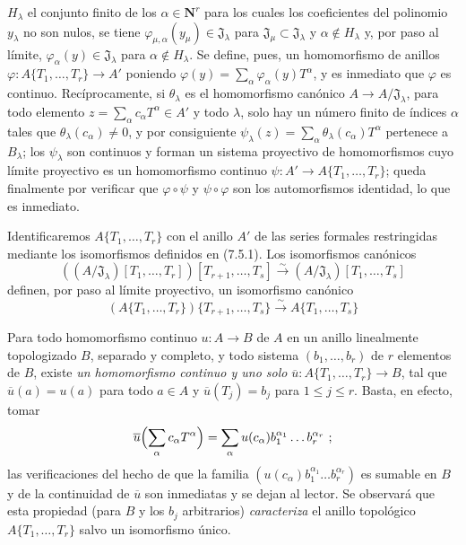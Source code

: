 \begin{env}[7.5.1]
$H_\lambda$ el conjunto finito de los $\alpha\in\mathbf{N}^r$ para los cuales los
coeficientes del polinomio $y_\lambda$ no son nulos, se tiene
$\varphi_{\mu,\alpha}(y_\mu)\in\mathfrak J_\lambda$ para
$\mathfrak J_\mu\subset\mathfrak J_\lambda$ y $\alpha\notin H_\lambda$ y,
por paso al límite, $\varphi_\alpha(y)\in\mathfrak J_\lambda$ para
$\alpha\notin H_\lambda$. Se define, pues, un homomorfismo de anillos
$\varphi:A\{T_1,\ldots,T_r\}\to A'$ poniendo
$\varphi(y)=\sum_\alpha\varphi_\alpha(y)T^\alpha$, y es inmediato que
$\varphi$ es continuo. Recíprocamente, si $\theta_\lambda$ es el homomorfismo
canónico $A\to A/\mathfrak J_\lambda$, para todo elemento
$z=\sum_\alpha c_\alpha T^\alpha\in A'$ y todo $\lambda$, solo hay un
número finito de índices $\alpha$ tales que $\theta_\lambda(c_\alpha)\neq0$, y
por consiguiente
$\psi_\lambda(z)=\sum_\alpha\theta_\lambda(c_\alpha)T^\alpha$ pertenece a
$B_\lambda$; los $\psi_\lambda$ son continuos y forman un sistema
proyectivo de homomorfismos cuyo límite proyectivo es un homomorfismo
continuo $\psi:A'\to A\{T_1,\ldots,T_r\}$; queda finalmente por verificar que
$\varphi\circ\psi$ y $\psi\circ\varphi$ son los automorfismos identidad,
lo que es inmediato.
\end{env}

\begin{env}[7.5.2]
\label{0.7.5.2-fr}
Identificaremos $A\{T_1,\ldots,T_r\}$ con el anillo $A'$ de las series formales
restringidas mediante los isomorfismos definidos en (7.5.1). Los isomorfismos
canónicos
\[
  ((A/\mathfrak J_\lambda)[T_1,\ldots,T_r])
  [T_{r+1},\ldots,T_s]
  \xrightarrow{\sim}
  (A/\mathfrak J_\lambda)[T_1,\ldots,T_s]
\]
definen, por paso al límite proyectivo, un isomorfismo canónico
\[
  (A\{T_1,\ldots,T_r\})\{T_{r+1},\ldots,T_s\}
  \xrightarrow{\sim}
  A\{T_1,\ldots,T_s\}
\]
\end{env}

\begin{env}[7.5.3]
\label{0.7.5.3-fr}
Para todo homomorfismo continuo $u:A\to B$ de $A$ en un anillo linealmente
topologizado $B$, separado y completo, y todo sistema $(b_1,\ldots,b_r)$ de $r$
elementos de $B$, existe \emph{un homomorfismo continuo y uno solo}
$\overline u:A\{T_1,\ldots,T_r\}\to B$, tal que $\overline u(a)=u(a)$ para
todo $a\in A$ y $\overline u(T_j)=b_j$ para $1\leq j\leq r$. Basta, en
efecto, tomar
\[
  \overline u\Bigl(\sum_\alpha c_\alpha T^\alpha\Bigr)
  =\sum_\alpha u(c_\alpha)b_1^{\alpha_1}\ldots b_r^{\alpha_r}~;
\]
las verificaciones del hecho de que la familia
$(u(c_\alpha)b_1^{\alpha_1}\ldots b_r^{\alpha_r})$ es sumable en $B$ y
de la continuidad de $\overline u$ son inmediatas y se dejan al lector. Se
observará que esta propiedad (para $B$ y los $b_j$ arbitrarios)
\emph{caracteriza} el anillo topológico $A\{T_1,\ldots,T_r\}$ salvo un
isomorfismo único.
\end{env}

